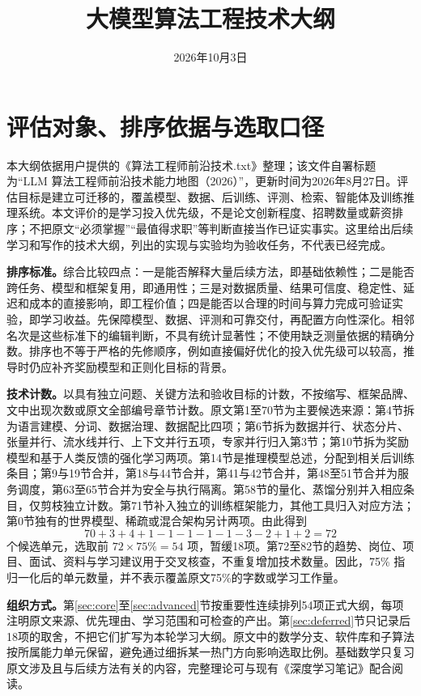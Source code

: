 \documentclass[UTF8,12pt,a4paper,fontset=fandol]{ctexart}
\title{大模型算法工程技术大纲}
\author{}
\date{2026年10月3日}
\begin{document}
\maketitle

\section{评估对象、排序依据与选取口径}
\label{sec:scope}

本大纲依据用户提供的《算法工程师前沿技术.txt》整理；该文件自署标题为“LLM 算法工程师前沿技术能力地图（2026）”，更新时间为2026年8月27日。评估目标是建立可迁移的，覆盖模型、数据、后训练、评测、检索、智能体及训练推理系统。本文评价的是学习投入优先级，不是论文创新程度、招聘数量或薪资排序；不把原文“必须掌握”“最值得求职”等判断直接当作已证实事实。这里给出后续学习和写作的技术大纲，列出的实现与实验均为验收任务，不代表已经完成。

\textbf{排序标准。}综合比较四点：一是能否解释大量后续方法，即基础依赖性；二是能否跨任务、模型和框架复用，即通用性；三是对数据质量、结果可信度、稳定性、延迟和成本的直接影响，即工程价值；四是能否以合理的时间与算力完成可验证实验，即学习收益。先保障模型、数据、评测和可靠交付，再配置方向性深化。相邻名次是这些标准下的编辑判断，不具有统计显著性；不使用缺乏测量依据的精确分数。排序也不等于严格的先修顺序，例如直接偏好优化的投入优先级可以较高，推导时仍应补齐奖励模型和正则化目标的背景。

\textbf{技术计数。}以具有独立问题、关键方法和验收目标的计数，不按缩写、框架品牌、文中出现次数或原文全部编号章节计数。原文第1至70节为主要候选来源：第4节拆为语言建模、分词、数据治理、数据配比四项；第6节拆为数据并行、状态分片、张量并行、流水线并行、上下文并行五项，专家并行归入第3节；第10节拆为奖励模型和基于人类反馈的强化学习两项。第14节是推理模型总述，分配到相关后训练条目；第9与19节合并，第18与44节合并，第41与42节合并，第48至51节合并为服务调度，第63至65节合并为安全与执行隔离。第58节的量化、蒸馏分别并入相应条目，仅剪枝独立计数。第71节补入独立的训练框架能力，其他工具归入对应方法；第0节独有的世界模型、稀疏或混合架构另计两项。由此得到
\[
70+3+4+1-1-1-1-1-3-2+1+2=72
\]
个候选单元，选取前 $72\times75\%=54$ 项，暂缓18项。第72至82节的趋势、岗位、项目、面试、资料与学习建议用于交叉核查，不重复增加技术数量。因此，75\% 指归一化后的单元数量，并不表示覆盖原文75\%的字数或学习工作量。

\textbf{组织方式。}第\ref{sec:core}至\ref{sec:advanced}节按重要性连续排列54项正式大纲，每项注明原文来源、优先理由、学习范围和可检查的产出。第\ref{sec:deferred}节只记录后18项的取舍，不把它们扩写为本轮学习大纲。原文中的数学分支、软件库和子算法按所属能力单元保留，避免通过细拆某一热门方向影响选取比例。基础数学只复习原文涉及且与后续方法有关的内容，完整理论可与现有《深度学习笔记》配合阅读。
\end{document}
